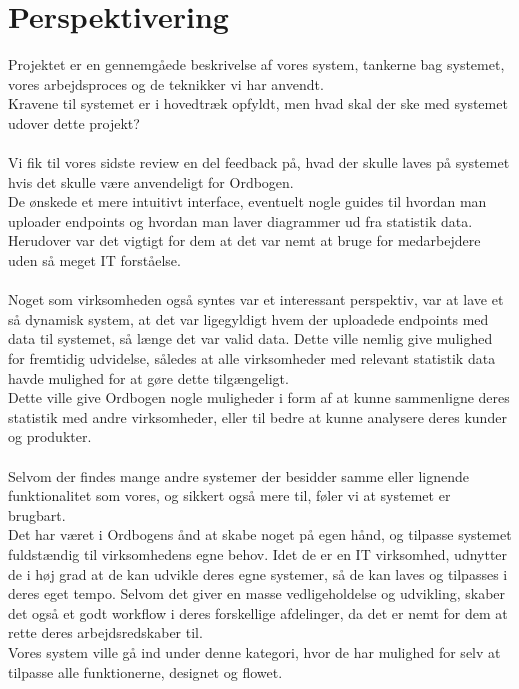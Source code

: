\section{Perspektivering}
Projektet er en gennemgåede beskrivelse af vores system, tankerne bag systemet, vores arbejdsproces og de teknikker vi har anvendt.
\\
Kravene til systemet er i hovedtræk opfyldt, men hvad skal der ske med systemet udover dette projekt?
\\\\
Vi fik til vores sidste review en del feedback på, hvad der skulle laves på systemet hvis det skulle være anvendeligt for Ordbogen.
\\
De ønskede et mere intuitivt interface, eventuelt nogle guides til hvordan man uploader endpoints og hvordan man laver diagrammer ud fra statistik data.
Herudover var det vigtigt for dem at det var nemt at bruge for medarbejdere uden så meget IT forståelse.
\\\\
Noget som virksomheden også syntes var et interessant perspektiv, var at lave et så dynamisk system, at det var ligegyldigt hvem der uploadede endpoints med data til systemet,
så længe det var valid data. Dette ville nemlig give mulighed for fremtidig udvidelse, således at alle virksomheder med relevant statistik data havde mulighed for at gøre dette tilgængeligt.
\\
Dette ville give Ordbogen nogle muligheder i form af at kunne sammenligne deres statistik med andre virksomheder, eller til bedre at kunne analysere deres kunder og produkter.
\\\\
Selvom der findes mange andre systemer der besidder samme eller lignende funktionalitet som vores, og sikkert også mere til, føler vi at systemet er brugbart.
\\
Det har været i Ordbogens ånd at skabe noget på egen hånd, og tilpasse systemet fuldstændig til virksomhedens egne behov.
Idet de er en IT virksomhed, udnytter de i høj grad at de kan udvikle deres egne systemer, så de kan laves og tilpasses i deres eget tempo.
Selvom det giver en masse vedligeholdelse og udvikling, skaber det også et godt workflow i deres forskellige afdelinger, da det er nemt for dem at rette deres arbejdsredskaber til.
\\
Vores system ville gå ind under denne kategori, hvor de har mulighed for selv at tilpasse alle funktionerne, designet og flowet.

